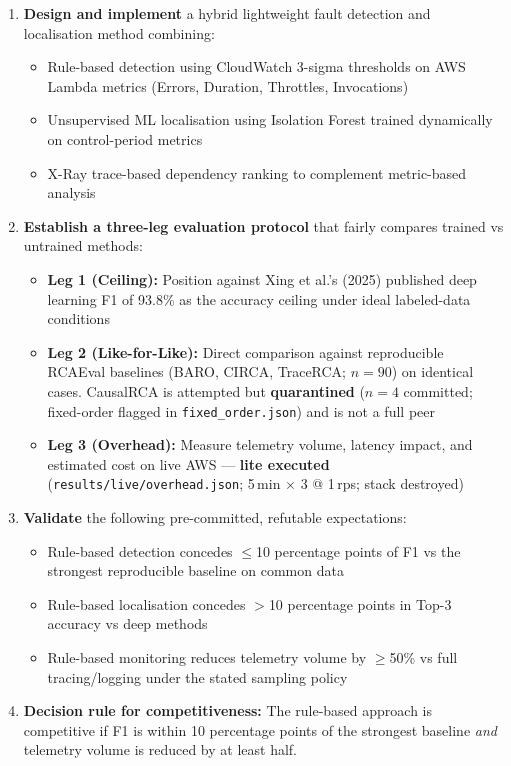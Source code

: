 \begin{enumerate}
    \item \textbf{Design and implement} a hybrid lightweight fault detection and localisation method combining:
    \begin{itemize}
        \item Rule-based detection using CloudWatch 3-sigma thresholds on AWS Lambda metrics (Errors, Duration, Throttles, Invocations)
        \item Unsupervised ML localisation using Isolation Forest trained dynamically on control-period metrics
        \item X-Ray trace-based dependency ranking to complement metric-based analysis
    \end{itemize}
    
    \item \textbf{Establish a three-leg evaluation protocol} that fairly compares trained vs untrained methods:
    \begin{itemize}
        \item \textbf{Leg 1 (Ceiling):} Position against Xing et al.'s (2025) published deep learning F1 of 93.8\% as the accuracy ceiling under ideal labeled-data conditions
        \item \textbf{Leg 2 (Like-for-Like):} Direct comparison against reproducible RCAEval baselines (BARO, CIRCA, TraceRCA; $n{=}90$) on identical cases. CausalRCA is attempted but \textbf{quarantined} ($n{=}4$ committed; fixed-order flagged in \texttt{fixed\_order.json}) and is not a full peer
        \item \textbf{Leg 3 (Overhead):} Measure telemetry volume, latency impact, and estimated cost on live AWS --- \textbf{lite executed} (\texttt{results/live/overhead.json}; 5\,min $\times$ 3 @ 1\,rps; stack destroyed)
    \end{itemize}
    
    \item \textbf{Validate} the following pre-committed, refutable expectations:
    \begin{itemize}
        \item Rule-based detection concedes $\leq$10 percentage points of F1 vs the strongest reproducible baseline on common data
        \item Rule-based localisation concedes $>$10 percentage points in Top-3 accuracy vs deep methods
        \item Rule-based monitoring reduces telemetry volume by $\geq$50\% vs full tracing/logging under the stated sampling policy
    \end{itemize}
    
    \item \textbf{Decision rule for competitiveness:} The rule-based approach is competitive if F1 is within 10 percentage points of the strongest baseline \textit{and} telemetry volume is reduced by at least half.
\end{enumerate}

